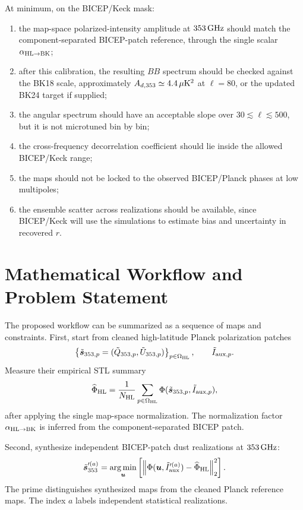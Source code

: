 \documentclass[11pt]{article}
\begin{document}
At minimum, on the BICEP/Keck mask:
\begin{enumerate}[label=(C\arabic*)]
  \item the map-space polarized-intensity amplitude at $353\,{\rm GHz}$ should
  match the component-separated BICEP-patch reference, through the single
  scalar $\alpha_{\rm HL\to BK}$;

  \item after this calibration, the resulting $BB$ spectrum should be checked
  against the BK18 scale, approximately
  $A_{d,353}\simeq 4.4\,\mu{\rm K}^2$ at $\ell=80$, or the updated BK24 target
  if supplied;

  \item the angular spectrum should have an acceptable slope over
  $30\lesssim\ell\lesssim500$, but it is not microtuned bin by bin;

  \item the cross-frequency decorrelation coefficient should lie inside the
  allowed BICEP/Keck range;

  \item the maps should not be locked to the observed BICEP/Planck phases at
  low multipoles;

  \item the ensemble scatter across realizations should be available, since
  BICEP/Keck will use the simulations to estimate bias and uncertainty in
  recovered $r$.
\end{enumerate}

\section{Mathematical Workflow and Problem Statement}

The proposed workflow can be summarized as a sequence of maps and constraints.
First, start from cleaned high-latitude Planck polarization patches
\[
  \left\{
    \tilde{\bm s}_{353,p}
    =
    (\tilde Q_{353,p},\tilde U_{353,p})
  \right\}_{p\in\Omega_{\rm HL}},
  \qquad
  \tilde I_{{\rm aux},p}.
\]
Measure their empirical STL summary
\[
  \widehat{\Phi}_{\rm HL}
  =
  \frac{1}{N_{\rm HL}}
  \sum_{p\in\Omega_{\rm HL}}
  \Phi(\tilde{\bm s}_{353,p},\tilde I_{{\rm aux},p}),
\]
after applying the single map-space normalization.  The normalization factor
$\alpha_{\rm HL\to BK}$ is inferred from the component-separated BICEP patch.

Second, synthesize independent BICEP-patch dust realizations at
$353\,{\rm GHz}$:
\[
  \tilde{\bm s}_{353}^{\prime(a)}
  =
  \operatorname*{arg\,min}_{\bm u}
  \left[
    \left\|
      \Phi(\bm u,\tilde I_{\rm aux}^{\prime(a)})
      -
      \widehat{\Phi}_{\rm HL}
    \right\|_2^2
  \right].
\]
The prime distinguishes synthesized maps from the cleaned Planck reference
maps.  The index $a$ labels independent statistical realizations.
\end{document}
